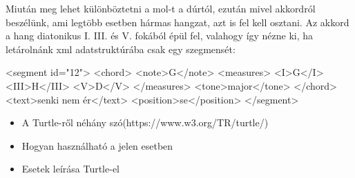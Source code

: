 Miután meg lehet különböztetni a mol-t a dúrtól, ezután mivel akkordról beszélünk, ami legtöbb esetben hármas hangzat, azt is fel kell osztani. Az akkord a hang diatonikus I. III. és V. fokából épül fel, valahogy így nézne ki, ha letárolnánk xml adatstruktúrába csak egy szegmensét:
\begin{xml}
<segment id="12">
   <chord>
      <note>G</note>
      <measures>
         <I>G</I>
         <III>H</III>
         <V>D</V>
      </measures>
      <tone>major</tone>
   </chord>
   <text>senki nem ér</text>
   <position>se</position>
</segment>
\end{xml}

\begin{itemize}
\item A Turtle-ről néhány szó(https://www.w3.org/TR/turtle/)
\item Hogyan használható a jelen esetben
\item Esetek leírása Turtle-el
\end{itemize}




